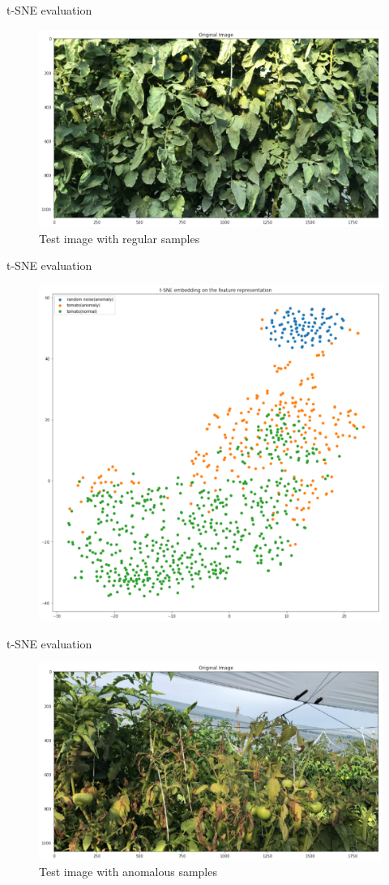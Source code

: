 \documentclass[15pt]{beamer} %
\begin{document}
\begin{frame}{t-SNE evaluation}
 \begin{figure}
  \centering
  \includegraphics[width=.85\textwidth]{anogan_test_image1}
  \caption{Test image with regular samples}
 \end{figure}
\end{frame}

\begin{frame}{t-SNE evaluation}
 \begin{figure}
  \centering
  \includegraphics[width=.6\textwidth]{anogan_t_sne1}
 \end{figure}
\end{frame}

\begin{frame}{t-SNE evaluation}
 \begin{figure}
  \centering
  \includegraphics[width=.85\textwidth]{anogan_test_image2}
  \caption{Test image with anomalous samples}
 \end{figure}
\end{frame}
\end{document}

